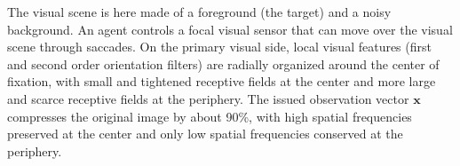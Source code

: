 \CNS

The visual scene is here made of a foreground (the target) and a noisy background. An agent controls a focal visual sensor that can move over the visual scene through saccades. 
On the primary visual side, local visual features (first and second order orientation filters) are radially organized around the center of fixation, with small and tightened receptive fields at the center and more large and scarce receptive fields at the periphery. The issued observation vector $\boldsymbol{x}$ compresses the original image by about 90\%, with high spatial frequencies preserved at the center and only low spatial frequencies conserved at the periphery. 
\fi


